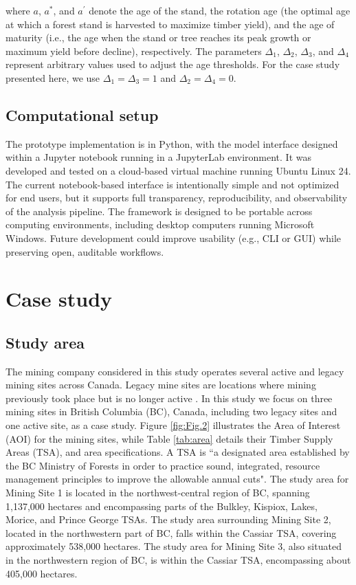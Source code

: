 \documentclass[preprint,12pt]{elsarticle}
\begin{document}
where $a$, $a^*$, and $a^{\prime}$ denote the age of the stand, the rotation age (the optimal age at which a forest stand is harvested to maximize timber yield), and the age of maturity (i.e., the age when the stand or tree reaches its peak growth or maximum yield before decline), respectively. The parameters $\Delta_1$, $\Delta_2$, $\Delta_3$, and $\Delta_4$ represent arbitrary values used to adjust the age thresholds. For the case study presented here, we use $\Delta_1 = \Delta_3 = 1$ and $\Delta_2 = \Delta_4 = 0$.

\subsection{Computational setup}
\label{Computational}
The prototype implementation is in Python, with the model interface designed within a Jupyter notebook running in a JupyterLab environment. It was developed and tested on a cloud-based virtual machine running Ubuntu Linux 24. The current notebook-based interface is intentionally simple and not optimized for end users, but it supports full transparency, reproducibility, and observability of the analysis pipeline. The framework is designed to be portable across computing environments, including desktop computers running Microsoft Windows. Future development could improve usability (e.g., CLI or GUI) while preserving open, auditable workflows.

\section{Case study}
\label{sec: Case Study}
\subsection{Study area}
\label{sec: Study area}
The mining company considered in this study operates several active and legacy mining sites across Canada. Legacy mine sites are locations where mining previously took place but is no longer active \citep{worrall2009towards}. In this study we focus on three mining sites in British Columbia (BC), Canada, including two legacy sites and one active site, as a case study. 
Figure \ref{fig:Fig.2} illustrates the Area of Interest (AOI) for the mining sites, while Table \ref{tab:area} details their Timber Supply Areas (TSA), and area specifications. A TSA is ``a designated area established by the BC Ministry of Forests in order to practice sound, integrated, resource management principles to improve the allowable annual cuts"\citep{CanadaOpenData2025}. The study area for Mining Site 1 is located in the northwest-central region of BC, spanning 1,137,000 hectares and encompassing parts of the Bulkley, Kispiox, Lakes, Morice, and Prince George TSAs. The study area surrounding Mining Site 2, located in the northwestern part of BC, falls within the Cassiar TSA, covering approximately 538,000 hectares. The study area for Mining Site 3, also situated in the northwestern region of BC, is within the Cassiar TSA, encompassing about 405,000 hectares. 
\end{document}
